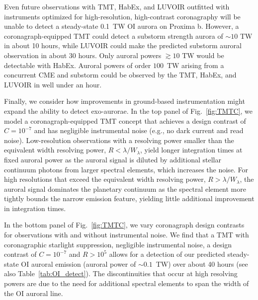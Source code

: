 \documentclass{emulateapj}
\newcommand{\yyy}[1]{{\color{black} #1}} %
\begin{document}
Even future observations with TMT, HabEx, and LUVOIR outfitted with instruments optimized for high-resolution, high-contrast coronagraphy will be unable to detect a steady-state 0.1~TW OI aurora on Proxima b. However, a coronagraph-equipped TMT could detect a substorm strength aurora of ${\sim} 10$ TW in about 10 hours, while LUVOIR could make the predicted substorm auroral observation in about 30 hours. Only auroral powers ${\gtrsim}10$ TW would be detectable with HabEx. %
Auroral powers of order $100$~TW arising from a concurrent CME and substorm could be observed by the TMT, HabEx, and LUVOIR in well under an hour.

Finally, we consider how improvements in ground-based instrumentation might expand the ability to detect exo-aurorae. In the top panel of Fig.~\ref{fig:TMTC}, we model a coronagraph-equipped TMT concept that achieves a design contrast of $C = 10^{-7}$ and has negligible instrumental noise (e.g., no dark current and read noise).  Low-resolution observations with a resolving power smaller than the equivalent width resolving power, $R < \lambda/W_\lambda$, yield longer integration times at fixed auroral power as the auroral signal is diluted by additional stellar continuum photons from larger spectral elements, which increases the noise.  For high resolutions that exceed the equivalent width resolving power, $R > \lambda/W_\lambda$, the auroral signal dominates the planetary continuum as the spectral element more tightly bounds the narrow emission feature, yielding little additional improvement in integration times.  %

In the bottom panel of Fig.~\ref{fig:TMTC}, we vary coronagraph design contrasts for observations with and without instrumental noise.  We find that a TMT with coronagraphic starlight suppression, negligible instrumental noise, a design contrast of $C = 10^{-7}$ and $R > 10^5$ allows for a detection of our predicted steady-state OI auroral emission (auroral power of ${\sim}0.1$~TW) over about 40 hours (see also Table~\ref{tab:OI_detect}). The discontinuities that occur at high resolving powers are due to the need for additional spectral elements to span the width of the OI auroral line.
\end{document}
